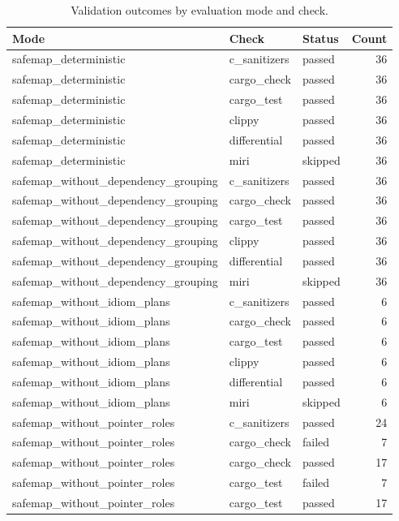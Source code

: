 \begin{table}[t]
\centering
\caption{Validation outcomes by evaluation mode and check.}
\label{tab:safemap-validation-statuses}
\begin{tabular}{lllr}
\hline
Mode & Check & Status & Count \\
\hline
safemap\_deterministic & c\_sanitizers & passed & 36 \\
safemap\_deterministic & cargo\_check & passed & 36 \\
safemap\_deterministic & cargo\_test & passed & 36 \\
safemap\_deterministic & clippy & passed & 36 \\
safemap\_deterministic & differential & passed & 36 \\
safemap\_deterministic & miri & skipped & 36 \\
safemap\_without\_dependency\_grouping & c\_sanitizers & passed & 36 \\
safemap\_without\_dependency\_grouping & cargo\_check & passed & 36 \\
safemap\_without\_dependency\_grouping & cargo\_test & passed & 36 \\
safemap\_without\_dependency\_grouping & clippy & passed & 36 \\
safemap\_without\_dependency\_grouping & differential & passed & 36 \\
safemap\_without\_dependency\_grouping & miri & skipped & 36 \\
safemap\_without\_idiom\_plans & c\_sanitizers & passed & 6 \\
safemap\_without\_idiom\_plans & cargo\_check & passed & 6 \\
safemap\_without\_idiom\_plans & cargo\_test & passed & 6 \\
safemap\_without\_idiom\_plans & clippy & passed & 6 \\
safemap\_without\_idiom\_plans & differential & passed & 6 \\
safemap\_without\_idiom\_plans & miri & skipped & 6 \\
safemap\_without\_pointer\_roles & c\_sanitizers & passed & 24 \\
safemap\_without\_pointer\_roles & cargo\_check & failed & 7 \\
safemap\_without\_pointer\_roles & cargo\_check & passed & 17 \\
safemap\_without\_pointer\_roles & cargo\_test & failed & 7 \\
safemap\_without\_pointer\_roles & cargo\_test & passed & 17 \\

\end{tabular}
\end{table}
